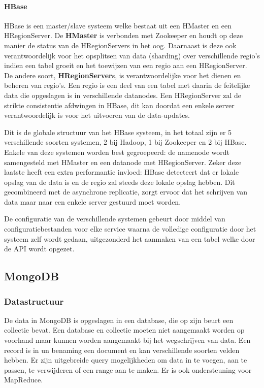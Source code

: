 \paragraph{HBase\cite{george2011hbase}} HBase is een master/slave systeem welke bestaat uit een HMaster en een HRegionServer. De \textbf{HMaster} is verbonden met Zookeeper en houdt op deze manier de status van de HRegionServers in het oog. Daarnaast is deze ook verantwoordelijk voor het opsplitsen van data (sharding) over verschillende regio's indien een tabel groeit en het toewijzen van een regio aan een HRegionServer.\\
De andere soort, \textbf{HRegionServer}s, is verantwoordelijke voor het dienen en beheren van regio's. Een regio is een deel van een tabel met daarin de feitelijke data die opgeslagen is in verschillende datanodes. Een HRegionServer zal de strikte consistentie afdwingen in HBase, dit kan doordat een enkele server verantwoordelijk is voor het uitvoeren van de data-updates. 

Dit is de globale structuur van het HBase systeem, in het totaal zijn er 5 verschillende soorten systemen, 2 bij Hadoop, 1 bij Zookeeper en 2 bij HBase. Enkele van deze systemen worden best gegroepeerd: de namenode wordt samengesteld met HMaster en een datanode met HRegionServer. Zeker deze laatste heeft een extra performantie invloed: HBase detecteert dat er lokale opslag van de data is en de regio zal steeds deze lokale opslag hebben. Dit gecombineerd met de asynchrone replicatie, zorgt ervoor dat het schrijven van data maar naar een enkele server gestuurd moet worden. 

De configuratie van de verschillende systemen gebeurt door middel van configuratiebestanden voor elke service waarna de volledige configuratie door het systeem zelf wordt gedaan, uitgezonderd het aanmaken van een tabel welke door de API wordt opgezet. 

\subsection{MongoDB\cite{mongodb-manual}}

\subsubsection{Datastructuur}
De data in MongoDB is opgeslagen in een database, die op zijn beurt een collectie bevat. Een database en collectie moeten niet aangemaakt worden op voorhand maar kunnen worden aangemaakt bij het wegschrijven van data. Een record is in un benaming een document en kan verschillende soorten velden hebben. Er zijn uitgebreide query mogelijkheden om data in te voegen, aan te passen, te verwijderen of een range aan te maken. Er is ook ondersteuning voor MapReduce\cite{dean2008mapreduce}. 

